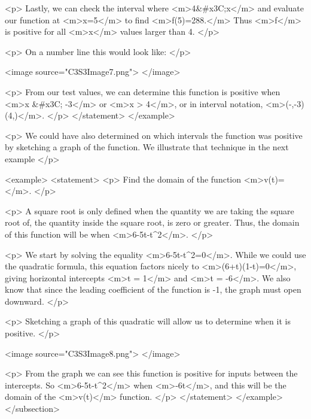                 <p>
                    Lastly, we can check the interval where <m>4&#x3C;x</m> and evaluate our function at <m>x=5</m> to find <m>f(5)=288.</m> Thus <m>f</m> is positive for all <m>x</m> values larger than 4.
                </p>

                <p>
                    On a number line this would look like:
                </p>

                <image source="C3S3Image7.png">
                </image>

                <p>
                    From our test values, we can determine this function is positive when <m>x &#x3C; -3</m> or <m>x > 4</m>, or in interval notation, <m>(-\infty,-3)\cup(4,\infty)</m>.
                </p>
            </statement>
        </example>

        <p>
            We could have also determined on which intervals the function was positive by sketching a graph of the function.
            We illustrate that technique in the next example
        </p>

        <example>
            <statement>
                <p>
                    Find the domain of the function <m>v(t)=</m>.
                </p>

                <p>
                    A square root is only defined when the quantity we are taking the square root of, the quantity inside the square root, is zero or greater.
                    Thus, the domain of this function will be when <m>6-5t-t^{2}</m>.
                </p>

                <p>
                    We start by solving the equality <m>6-5t-t^{2}=0</m>.
                    While we could use the quadratic formula, this equation factors nicely to <m>(6+t)(1-t)=0</m>, giving horizontal intercepts <m>t = 1</m> and <m>t = -6</m>.
                    We also know that since the leading coefficient of the function is -1, the graph must open downward.
                </p>

                <p>
                    Sketching a graph of this quadratic will allow us to determine when it is positive.
                </p>

                <image source="C3S3Image8.png">
                </image>

                <p>
                    From the graph we can see this function is positive for inputs between the intercepts.
                    So <m>6-5t-t^{2}</m> when <m>-6\leq t</m>, and this will be the domain of the <m>v(t)</m> function.
                </p>
            </statement>
        </example>
    </subsection>


